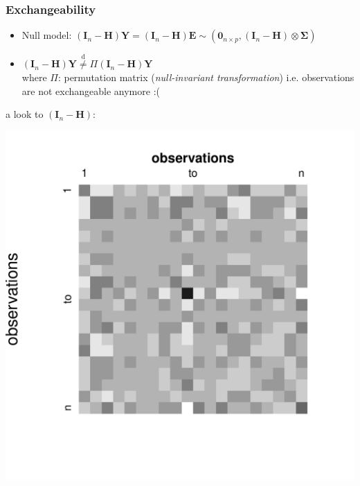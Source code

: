\documentclass[xcolor={pdftex,dvipsnames,table}]{beamer}
\newcommand{\bi}{\begin {itemize}}
\newcommand{\ei}{\end{itemize}}
\newcommand{\Perm}{\Pi}
\newcommand{\HH}{\mathbf{H}}
\newcommand{\IH}{(\mathbf{I}_n-\mathbf{H})}
\begin{document}
\begin{frame}[fragile]
\frametitle{Exchangeability}
\bi
\item Null model:
$
\displaystyle  \IH\mathbf{Y}=  \IH\mathbf{E} \sim (\mathbf{0}_{n\times p}, \IH \otimes \mathbf{\Sigma} )
$ 


\item 
$\displaystyle \IH\mathbf{Y} \stackrel{\mathrm{d}}{\neq} \Perm\IH\mathbf{Y}$ \\
where $\Perm$: permutation matrix  (\emph{null-invariant transformation})
\pause
i.e. observations are not exchangeable anymore :(
\ei

a look to $\IH$:

\includegraphics[scale=.30]{figures_perm_covariates/Preg}

\end{frame}
\end{document}
